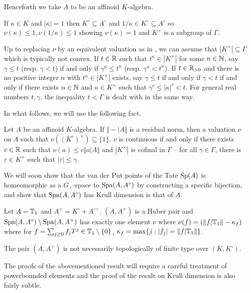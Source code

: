 Henceforth we take $A$ to be an affinoid $K$-algebra. 
\begin{example}
    If $\kappa\in K$ and $|\kappa|=1$ then $K^{\circ}\subseteq A^{\circ}$ and $1/\kappa\in K^{\circ}\subseteq A^{\circ}$ so $\nu(\kappa)\leq 1,\nu(1/\kappa)\leq 1$ showing $\nu(\kappa)=1$ and $K^{\times}$ is a subgroup of $\Gamma$. 
\end{example}
Up to replacing $\nu$ by an equivalent valuation as in , we can assume that $|K^{\times}|\subseteq\Gamma$ which is typically not convex. If $t\in\mathbb{R}$ such that $t^{n}\in|K^{\times}|$ for some $n\in\mathbb{N}$, say $\gamma\leq t$ (resp. $\gamma<t$) if and only if $\gamma^{n}\leq t^{n}$ (resp. $\gamma^{n}<t^{n}$). If $t\in\mathbb{R}_{>0}$ and there is no positive integer $n$ with $t^{n}\in |K^{\times}|$ exists, say $\gamma\leq t$ if and only if $\gamma<t$ if and only if there exists $n\in\mathbb{N}$ and $\kappa\in K^{\times}$ such that $\gamma^{r}\leq|\kappa|^{r}<t$. For general real numbers $t,\gamma$, the inequality $t<\Gamma$ is dealt with in the same way. 

In what follows, we will use the following fact. 
\begin{lemma}
    Let $A$ be an affinoid $K$-algebra. If $\Vert-|A\Vert$ is a residual norm, then a valuation $\nu$ on $A$ such that $\nu((K^{\circ})^{\times})\subseteq\{1\}$. $\nu$ is continuous if and only if there exists $c\in\mathbb{R}$ such that $\nu(a)\leq c\Vert a|A\Vert$ and $|K^{\times}|$ is cofinal in $\Gamma$ -- for all $\gamma\in\Gamma$, there is $\varepsilon\in K^{\times}$ such that $|\varepsilon|\leq\gamma$. 
\end{lemma}
We will soon show that the van der Put points of the Tate $\mathrm{Sp}(A)$ is homeomorphic as a $G_{+}$-space to $\mathrm{Spa}(A,A^{\circ})$ by constructing a specific bijection, and show that $\mathrm{Spa}(A,A^{\circ})$ has Krull dimension is that of $A$. 
\begin{example}
    Let $A=\mathbb{T}_{1}$ and $A^{+}=K^{\circ}+A^{\circ\circ}$. $(A,A^{+})$ is a Huber pair and $\mathrm{Spa}(A,A^{\circ})\setminus\mathrm{Spa}(A,A^{+})$ has exactly one element $\nu$ where $\nu(f)=(\Vert f|\mathbb{T}_{1}\Vert -\kappa_{f})$ where for $f=\sum_{j\geq0}f_{j}T^{j}\in\mathbb{T}_{1}\setminus\{0\}$, $\kappa_{f}=\max\{j:|f_{j}|=\Vert f|\mathbb{T}_{1}\Vert\}$. 
\end{example}
\begin{remark}
    The pair $(A,A^{+})$ is not necessarily topologically of finite type over $(K,K^{\circ})$. 
\end{remark}
The proofs of the abovementioned result will require a careful treatment of powerbounded elements and the proof of the result on Krull dimension is also fairly subtle. 